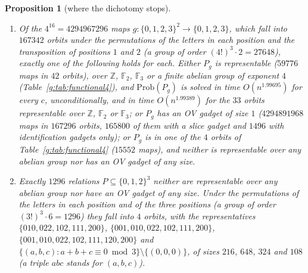 \documentclass[11pt]{article}
\newtheorem{proposition}[theorem]{Proposition}
\theoremstyle{definition}
\theoremstyle{remark}
\newcommand{\Z}{\mathbb{Z}}
\newcommand{\F}{\mathbb{F}_2}
\newcommand{\Prob}{\mathrm{Prob}}
\newcommand{\ExpBestUp}{1.99389}%
\newcommand{\ExpHalfBestUp}{1.99695}%
\begin{document}
\begin{proposition}[where the dichotomy stops]
\begin{enumerate}[label=\textup{(\alph*)}]
\item Of the $4^{16}=4294967296$ maps $g\colon\{0,1,2,3\}^2\to\{0,1,2,3\}$, which fall into $167342$ orbits under the permutations of the letters in each position and the transposition of positions $1$ and $2$ (a group of order $(4!)^3\cdot2=27648$), exactly one of the following holds for each. Either $P_g$ is representable ($59776$ maps in $42$ orbits), over $\Z$, $\F$, $\mathbb F_3$ or a finite abelian group of exponent $4$ (Table~\ref{g:tab:functional4}), and $\Prob(P_g)$ is solved in time $O(n^{\ExpHalfBestUp})$ for every $c$, unconditionally, and in time $O(n^{\ExpBestUp})$ for the $33$ orbits representable over $\Z$, $\F$ or $\mathbb F_3$; or $P_g$ has an OV gadget of size $1$ ($4294891968$ maps in $167296$ orbits, $165800$ of them with a slice gadget and $1496$ with identification gadgets only); or $P_g$ is in one of the $4$ orbits of Table~\ref{g:tab:functional4} ($15552$ maps), and neither is representable over any abelian group nor has an OV gadget of any size.
\item Exactly $1296$ relations $P\subseteq\{0,1,2\}^3$ neither are representable over any abelian group nor have an OV gadget of any size. Under the permutations of the letters in each position and of the three positions (a group of order $(3!)^3\cdot6=1296$) they fall into $4$ orbits, with the representatives $\{010,022,102,111,200\}$, $\{001,010,022,102,111,200\}$, $\{001,010,022,102,111,120,200\}$ and $\{(a,b,c):a+b+c\equiv0\bmod3\}\setminus\{(0,0,0)\}$, of sizes $216$, $648$, $324$ and $108$ (a triple $abc$ stands for $(a,b,c)$).
\end{enumerate}
\end{proposition}
\end{document}
